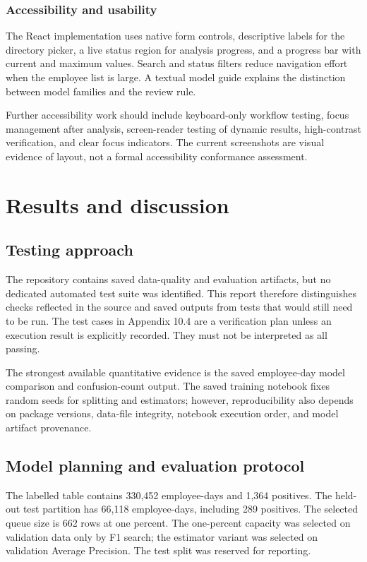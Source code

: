 \documentclass[12pt,a4paper,oneside]{report}
\begin{document}
\subsection{Accessibility and usability}
The React implementation uses native form controls, descriptive labels
for the directory picker, a live status region for analysis progress,
and a progress bar with current and maximum values. Search and status
filters reduce navigation effort when the employee list is large. A
textual model guide explains the distinction between model families
and the review rule.

Further accessibility work should include keyboard-only workflow
testing, focus management after analysis, screen-reader testing of
dynamic results, high-contrast verification, and clear focus
indicators. The current screenshots are visual evidence of layout,
not a formal accessibility conformance assessment.

\chapter{Results and discussion}
\label{chap:results}

\section{Testing approach}
The repository contains saved data-quality and evaluation artifacts,
but no dedicated automated test suite was identified. This report
therefore distinguishes checks reflected in the source and saved
outputs from tests that would still need to be run. The test cases in
Appendix 10.4 are a verification plan unless an execution result is
explicitly recorded. They must not be interpreted as all passing.

The strongest available quantitative evidence is the saved
employee-day model comparison and confusion-count output. The saved
training notebook fixes random seeds for splitting and estimators;
however, reproducibility also depends on package versions, data-file
integrity, notebook execution order, and model artifact provenance.

\section{Model planning and evaluation protocol}
The labelled table contains 330,452 employee-days and 1,364 positives.
The held-out test partition has 66,118 employee-days, including 289
positives. The selected queue size is 662 rows at one percent. The
one-percent capacity was selected on validation data only by F1 search;
the estimator variant was selected on validation Average Precision.
The test split was reserved for reporting.
\end{document}
